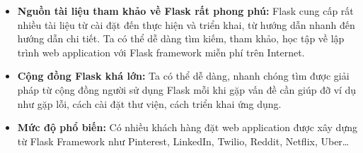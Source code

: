 \begin{itemize}
  \item \textbf{Nguồn tài liệu tham khảo về Flask rất phong phú:} Flask cung cấp rất nhiều tài liệu từ cài đặt đến thực hiện và triển khai, từ hướng dẫn nhanh đến hướng dẫn chi tiết. Ta có thể dễ dàng tìm kiếm, tham khảo, học tập về lập trình web application với Flask framework miễn phí trên Internet.
  \item \textbf{Cộng đồng Flask khá lớn:} Ta có thể dễ dàng, nhanh chóng tìm được giải pháp từ cộng đồng người sử dụng Flask mỗi khi gặp vấn đề cần giúp đỡ ví dụ như gặp lỗi, cách cài đặt thư viện, cách triển khai ứng dụng.
  \item \textbf{Mức độ phổ biến:} Có nhiều khách hàng đặt web application được xây dựng từ Flask Framework như Pinterest, LinkedIn, Twilio, Reddit, Netflix, Uber…
\end{itemize}